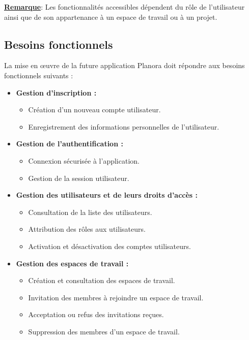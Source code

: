 \underline{\textbf{Remarque}}: Les fonctionnalités accessibles dépendent du rôle de l'utilisateur ainsi que de son appartenance à un espace de travail ou à un projet.

\subsection{Besoins fonctionnels}

La mise en \oe{}uvre de la future application Planora doit répondre aux besoins fonctionnels suivants :
\begin{itemize}
  \item[$\bullet$] \textbf{Gestion d'inscription :}
        \begin{itemize}
          \item[$\circ$] Création d'un nouveau compte utilisateur.
          \item[$\circ$] Enregistrement des informations personnelles de l'utilisateur.
        \end{itemize}

  \item[$\bullet$] \textbf{Gestion de l'authentification :}
        \begin{itemize}
          \item[$\circ$] Connexion sécurisée à l'application.
          \item[$\circ$] Gestion de la session utilisateur.
        \end{itemize}

  \item[$\bullet$] \textbf{Gestion des utilisateurs et de leurs droits d'accès :}
        \begin{itemize}
          \item[$\circ$] Consultation de la liste des utilisateurs.
          \item[$\circ$] Attribution des rôles aux utilisateurs.
          \item[$\circ$] Activation et désactivation des comptes utilisateurs.
        \end{itemize}

  \item[$\bullet$] \textbf{Gestion des espaces de travail :}
        \begin{itemize}
          \item[$\circ$] Création et consultation des espaces de travail.
          \item[$\circ$] Invitation des membres à rejoindre un espace de travail.
          \item[$\circ$] Acceptation ou refus des invitations reçues.
          \item[$\circ$] Suppression des membres d'un espace de travail.
        \end{itemize}


\end{itemize}
